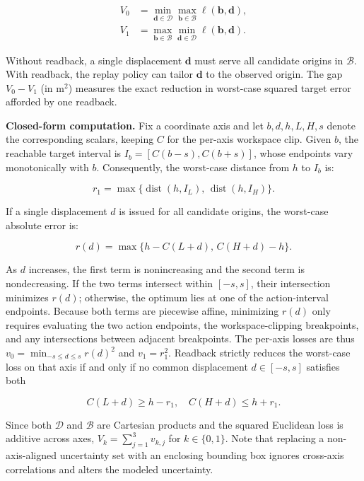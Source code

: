 \documentclass[conference]{IEEEtran}
\begin{document}
\begin{equation}
\begin{aligned}
V_0 &= \min_{\mathbf{d} \in \mathcal{D}} \max_{\mathbf{b} \in \mathcal{B}} \ell(\mathbf{b}, \mathbf{d}), \\
V_1 &= \max_{\mathbf{b} \in \mathcal{B}} \min_{\mathbf{d} \in \mathcal{D}} \ell(\mathbf{b}, \mathbf{d}).
\end{aligned}
\label{eq:e2}
\end{equation}

Without readback, a single displacement $\mathbf{d}$ must serve all candidate origins in $\mathcal{B}$. With readback, the replay policy can tailor $\mathbf{d}$ to the observed origin. The gap $V_0 - V_1$ (in $\text{m}^2$) measures the exact reduction in worst-case squared target error afforded by one readback.

\textbf{Closed-form computation.} Fix a coordinate axis and let $b, d, h, L, H, s$ denote the corresponding scalars, keeping $C$ for the per-axis workspace clip. Given $b$, the reachable target interval is $I_b = [C(b - s), C(b + s)]$, whose endpoints vary monotonically with $b$. Consequently, the worst-case distance from $h$ to $I_b$ is:

\[
r_1 = \max\{\operatorname{dist}(h, I_L),\, \operatorname{dist}(h, I_H)\}.
\]

If a single displacement $d$ is issued for all candidate origins, the worst-case absolute error is:

\[
r(d) = \max\{h - C(L + d),\, C(H + d) - h\}.
\]

As $d$ increases, the first term is nonincreasing and the second term is nondecreasing. If the two terms intersect within $[-s, s]$, their intersection minimizes $r(d)$; otherwise, the optimum lies at one of the action-interval endpoints. Because both terms are piecewise affine, minimizing $r(d)$ only requires evaluating the two action endpoints, the workspace-clipping breakpoints, and any intersections between adjacent breakpoints. The per-axis losses are thus $v_0 = \min_{-s \le d \le s} r(d)^2$ and $v_1 = r_1^2$. Readback strictly reduces the worst-case loss on that axis if and only if no common displacement $d \in [-s, s]$ satisfies both

\begin{equation}
C(L + d) \ge h - r_1, \quad C(H + d) \le h + r_1.
\label{eq:e3}
\end{equation}

Since both $\mathcal{D}$ and $\mathcal{B}$ are Cartesian products and the squared Euclidean loss is additive across axes, $V_k = \sum_{j=1}^3 v_{k,j}$ for $k \in \{0, 1\}$. Note that replacing a non-axis-aligned uncertainty set with an enclosing bounding box ignores cross-axis correlations and alters the modeled uncertainty.
\end{document}
